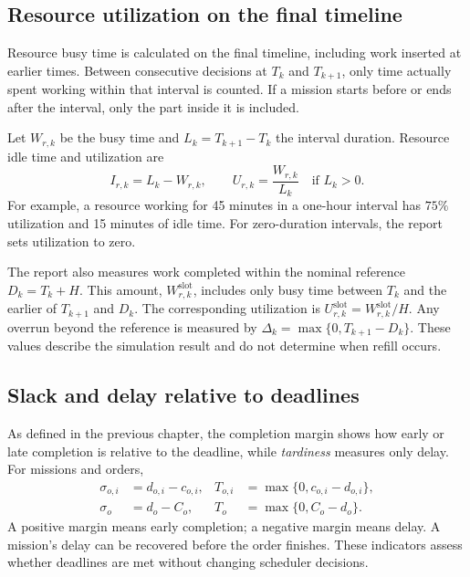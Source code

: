 \subsection{Resource utilization on the final timeline}

Resource busy time is calculated on the final timeline, including work inserted
at earlier times. Between consecutive decisions at $T_k$ and $T_{k+1}$, only
time actually spent working within that interval is counted. If a mission
starts before or ends after the interval, only the part inside it is included.

Let $W_{r,k}$ be the busy time and $L_k=T_{k+1}-T_k$ the interval duration.
Resource idle time and utilization are
\begin{equation}
    I_{r,k}=L_k-W_{r,k},\qquad
    U_{r,k}=\frac{W_{r,k}}{L_k}\quad\text{if }L_k>0.
    \label{eq:occupazione-timeline}
\end{equation}
For example, a resource working for 45 minutes in a one-hour interval has
$75\%$ utilization and 15 minutes of idle time. For zero-duration intervals,
the report sets utilization to zero.

The report also measures work completed within the nominal reference
$D_k=T_k+H$. This amount, $W_{r,k}^{\mathrm{slot}}$, includes only busy time
between $T_k$ and the earlier of $T_{k+1}$ and $D_k$. The corresponding
utilization is $U_{r,k}^{\mathrm{slot}}=W_{r,k}^{\mathrm{slot}}/H$.
Any overrun beyond the reference is measured by
$\Delta_k=\max\{0,T_{k+1}-D_k\}$.
These values describe the simulation result and do not determine when refill
occurs.

\subsection{Slack and delay relative to deadlines}

As defined in the previous chapter, the completion margin shows how early or
late completion is relative to the deadline, while \textit{tardiness} measures
only delay. For missions and orders,
\begin{equation}
    \begin{aligned}
        \sigma_{o,i}&=d_{o,i}-c_{o,i}, &
        T_{o,i}&=\max\{0,c_{o,i}-d_{o,i}\},\\
        \sigma_o&=d_o-C_o, &
        T_o&=\max\{0,C_o-d_o\}.
    \end{aligned}
\end{equation}
A positive margin means early completion; a negative margin means delay.
A mission's delay can be recovered before the order finishes. These indicators
assess whether deadlines are met without changing scheduler decisions.
